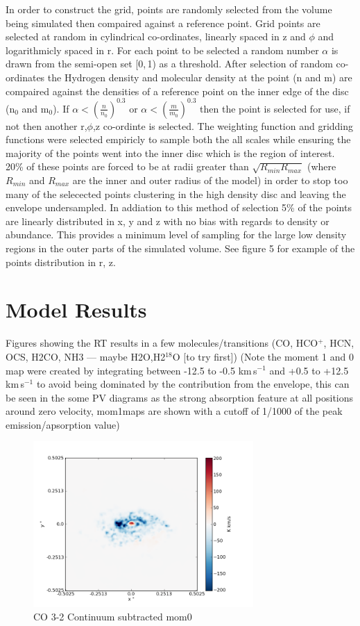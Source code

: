 \documentclass[useAMS,usenatbib]{mn2e}
\begin{document}
In order to construct the grid, points are randomly selected from the volume being simulated then compaired against a reference point. Grid points are selected at random in cylindrical co-ordinates, linearly spaced in z and $\phi$ and logarithmicly spaced in r. For each point to be selected a random number $\alpha$ is drawn from the semi-open set [0,$\,$1) as a threshold. After selection of random co-ordinates the Hydrogen density and molecular density at the point (n and m) are compaired against the densities of a reference point on the inner edge of the disc (n$_0$ and m$_0$). If $\alpha<\left( \frac{n}{n_0} \right)^{0.3}$ or $\alpha< \left( \frac{m}{m_0} \right)^{0.3}$ then the point is selected for use, if not then another r,$\phi$,z co-ordinte is selected. The weighting function and gridding functions were selected empiricly to sample both the all scales while ensuring the majority of the points went into the inner disc which is the region of interest. 20\% of these points are forced to be at radii greater than $\sqrt{R_{min}R_{max}}$ (where $R_{min}$ and $R_{max}$ are the inner and outer radius of the model) in order to stop too many of the selecected points clustering in the high density disc and leaving the envelope undersampled. In addiation to this method of selection 5\% of the points are linearly distributed in x, y and z with no bias with regards to density or abundance. This provides a minimum level of sampling for the large low density regions in the outer parts of the simulated volume. See figure 5 for example of the points distribution in r, z.


\section{Model Results}

Figures showing the RT results in a few molecules/transitions (CO, HCO$^+$, HCN, OCS, H2CO, NH3 --- maybe H2O,H2$^{18}$O [to try first]) (Note the moment 1 and 0 map were created by integrating between -12.5 to -0.5 km$\,$s$^{-1}$ and +0.5 to +12.5 km$\,$s$^{-1}$ to avoid being dominated by the contribution from the envelope, this can be seen in the some PV diagrams as the strong absorption feature at all positions around zero velocity, mom1maps are shown with a cutoff of 1/1000 of the peak emission/apsorption value)

\begin{figure}
 \includegraphics[width=84mm]{Figures/sim/imageCO_3-2_30deg_contSub.png}

 \caption{CO 3-2 Continuum subtracted mom0}
\end{figure}
\end{document}

